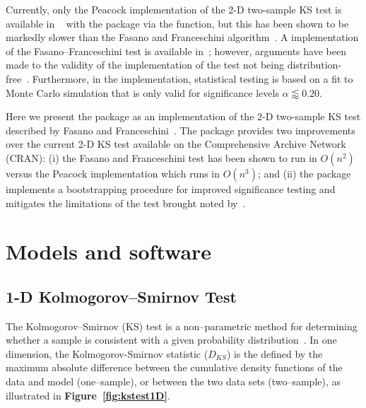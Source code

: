 \documentclass[codesnippet]{jss}
\newcommand{\fct}[1]{\code{#1()}}
\begin{document}
Currently, only the Peacock implementation of the 2-D two-sample KS
test is available in ~\citep{R} with the
 package via the \fct{peacock2} function, but this
has been shown to be markedly slower than the Fasano and Franceschini
algorithm~\citep{Lopes2007}. A  implementation of the
Fasano--Franceschini test is available in~\cite{numericalRecipes};
however, arguments have been made to the validity of the
implementation of the test not being
distribution-free~\citep{Babu2006}. Furthermore, in the 
implementation, statistical testing is based on a fit to Monte Carlo
simulation that is only valid for significance levels $\alpha \lessapprox 0.20$.

Here we present the  package as an
 implementation of the 2-D two-sample KS test described
by Fasano and Franceschini~\citep{Fasano1987}. The
 package provides two improvements over
the current 2-D KS test available on the Comprehensive  Archive
Network (CRAN): (i) the Fasano and Franceschini test has been shown to
run in $O(n^2)$ versus the Peacock implementation which runs in
$O(n^3)$; and (ii) the package implements a bootstrapping procedure
for improved significance testing and mitigates the limitations of
the test brought noted by~\citet{Babu2006}.

\section{Models and software} \label{sec:models}

\subsection{1-D Kolmogorov--Smirnov Test}

The Kolmogorov--Smirnov (KS) test is a non--parametric method for
determining whether a sample is consistent with a given probability
distribution~\citep{Stephens1992a}.
%
In one dimension, the Kolmogorov-Smirnov statistic ($D_{KS}$) is the
defined by the maximum absolute difference between the cumulative
density functions of the data and model (one--sample), or between the
two data sets (two--sample), as illustrated in
\textbf{Figure~\ref{fig:kstest1D}}.
\end{document}
